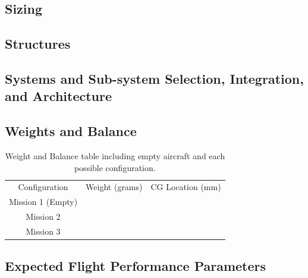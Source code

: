 \documentclass[report]{byu-aero}
\begin{document}
\subsection{Sizing}
\label{ssec:sizing}




\subsection{Structures}
\label{ssec:structures}




\subsection{Systems and Sub-system Selection, Integration, and Architecture}
\label{ssec:systemdetails}




\subsection{Weights and Balance}
\label{ssec:weightsandbalance}


\begin{table}[h!]
	\centering
	\caption{Weight and Balance table including empty aircraft and each possible configuration.}
	\label{tab:wieghtsandbalance}
	\begin{tabular}{ c c c } 

		\rowcolor{BYUbluemid}
    	Configuration & Weight (grams) & CG Location (mm) \\

	    Mission 1 (Empty) &  &  \\

		Mission 2 &  &  \\

		Mission 3 &  &  \\

	\end{tabular}
\end{table}



\subsection{Expected Flight Performance Parameters}
\label{ssec:flightperformanceparams}
\end{document}
